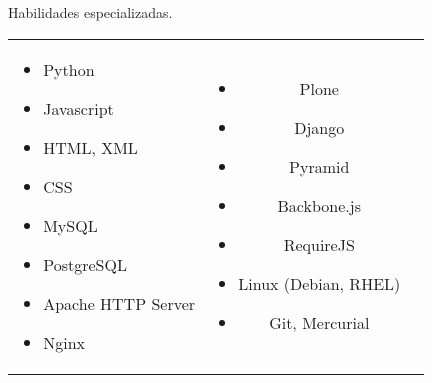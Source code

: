 \documentclass{resume} %
\begin{document}
\begin{rSection}{Habilidades especializadas.}

    \begin{tabular}{l c r}
        \parbox{0.5\textwidth}{
            \begin{itemize}
                \item Python
                \item Javascript
                \item HTML, XML
                \item CSS
                \item MySQL
                \item PostgreSQL
                \item Apache HTTP Server
                \item Nginx
            \end{itemize}
        } &
        \parbox{0.4\textwidth}{
            \begin{itemize}
                \item Plone
                \item Django
                \item Pyramid
                \item Backbone.js
                \item RequireJS
                \item Linux (Debian, RHEL)
                \item Git, Mercurial
            \end{itemize}
        }
    \end{tabular}
    \\
\end{rSection}
\end{document}
